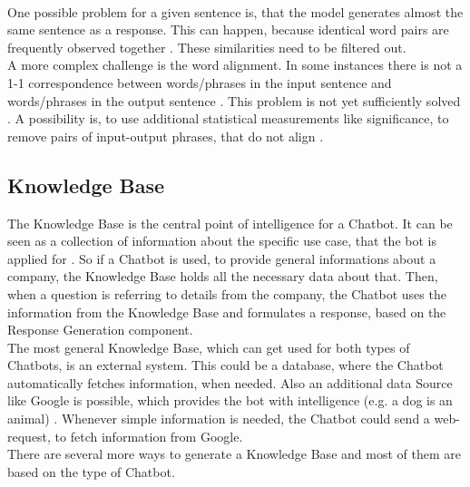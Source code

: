 \documentclass[10pt,final,journal,a4paper,oneside,twocolumn]{IEEEtran}
\begin{document}
\\
One possible problem for a given sentence is, that the model generates almost the same sentence as a response. This can happen, because identical word pairs are frequently observed together \cite{b14}. These similarities need to be filtered out.\\
A more complex challenge is the word alignment. In some instances there is not a 1-1 correspondence between words/phrases in the input sentence and words/phrases in the output sentence \cite{b6}. This problem is not yet sufficiently solved \cite{b14}. A possibility is, to use additional statistical measurements like significance, to remove pairs of input-output phrases, that do not align \cite{b14}.

\subsection{Knowledge Base}\label{sec::kb}
The Knowledge Base is the central point of intelligence for a Chatbot. It can be seen as a collection of information about the specific use case, that the bot is applied for \cite{b15}. So if a Chatbot is used, to provide general informations about a company, the Knowledge Base holds all the necessary data about that. Then, when a question is referring to details from the company, the Chatbot uses the information from the Knowledge Base and formulates a response, based on the Response Generation component.\\
The most general Knowledge Base, which can get used for both types of Chatbots, is an external system. This could be a database, where the Chatbot automatically fetches information, when needed. Also an additional data Source like Google is possible, which provides the bot with intelligence (e.g. a dog is an animal) \cite{b6}. Whenever simple information is needed, the Chatbot could send a web-request, to fetch information from Google.\\
There are several more ways to generate a Knowledge Base and most of them are based on the type of Chatbot.
\\
\end{document}
